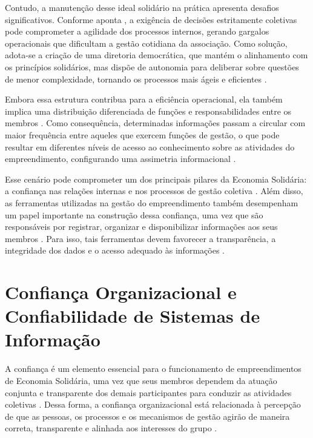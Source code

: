 Contudo, a manutenção desse ideal solidário na prática apresenta desafios significativos. Conforme aponta , a exigência de decisões estritamente coletivas pode comprometer a agilidade dos processos internos, gerando gargalos operacionais que dificultam a gestão cotidiana da associação. Como solução, adota-se a criação de uma diretoria democrática, que mantém o alinhamento com os princípios solidários, mas dispõe de autonomia para deliberar sobre questões de menor complexidade, tornando os processos mais ágeis e eficientes \cite{aguiar2026}.

Embora essa estrutura contribua para a eficiência operacional, ela também implica uma distribuição diferenciada de funções e responsabilidades entre os membros \cite{aguiar2026, singer2002}. Como consequência, determinadas informações passam a circular com maior frequência entre aqueles que exercem funções de gestão, o que pode resultar em diferentes níveis de acesso ao conhecimento sobre as atividades do empreendimento, configurando uma assimetria informacional \cite{bertolin2008, aguiar2026}.

Esse cenário pode comprometer um dos principais pilares da Economia Solidária: a confiança nas relações internas e nos processos de gestão coletiva \cite{bertolin2008}. Além disso, as ferramentas utilizadas na gestão do empreendimento também desempenham um papel importante na construção dessa confiança, uma vez que são responsáveis por registrar, organizar e disponibilizar informações aos seus membros \cite{aguiar2026, pereira2025}. Para isso, tais ferramentas devem favorecer a transparência, a integridade dos dados e o acesso adequado às informações \cite{aguiar2026, bertolin2008, pereira2025}. 

\section{Confiança Organizacional e Confiabilidade de Sistemas de Informação} \label{sec:confiança}

A confiança é um elemento essencial para o funcionamento de empreendimentos de Economia Solidária, uma vez que seus membros dependem da atuação conjunta e transparente dos demais participantes para conduzir as atividades coletivas \cite{bertolin2008}. Dessa forma, a confiança organizacional está relacionada à percepção de que as pessoas, os processos e os mecanismos de gestão agirão de maneira correta, transparente e alinhada aos interesses do grupo \cite{candeias2025}.

